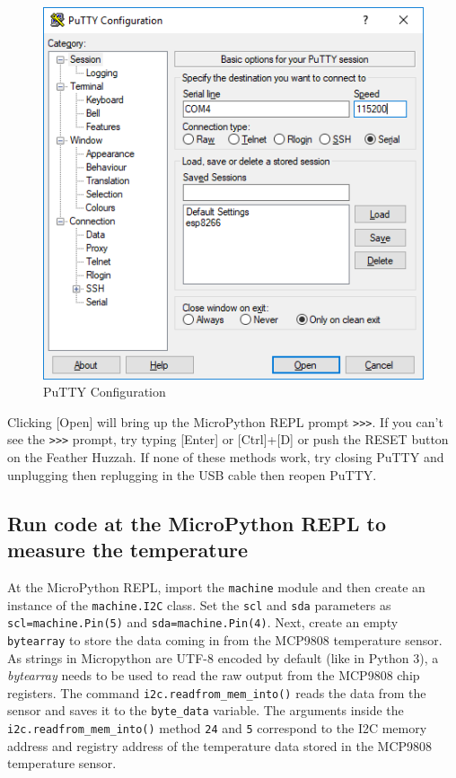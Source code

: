 \documentclass{book}
\makeatletter
\def\maxwidth{\ifdim\Gin@nat@width>\linewidth\linewidth
    \else\Gin@nat@width\fi}
\let\Oldincludegraphics\includegraphics
\renewcommand{\includegraphics}[1]{\Oldincludegraphics[width=.8\maxwidth]{#1}}
\makeatother
\begin{document}
\begin{figure}
\centering
\includegraphics{images/putty_config.PNG}
\caption{PuTTY Configuration}
\end{figure}

Clicking {[}Open{]} will bring up the MicroPython REPL prompt
\lstinline!>>>!. If you can't see the \lstinline!>>>! prompt, try typing
{[}Enter{]} or {[}Ctrl{]}+{[}D{]} or push the RESET button on the
Feather Huzzah. If none of these methods work, try closing PuTTY and
unplugging then replugging in the USB cable then reopen PuTTY.
    




    
        \subsection{Run code at the MicroPython REPL to measure the
temperature}\label{run-code-at-the-micropython-repl-to-measure-the-temperature}
    




    
        At the MicroPython REPL, import the \lstinline!machine! module and then
create an instance of the \lstinline!machine.I2C! class. Set the
\lstinline!scl! and \lstinline!sda! parameters as
\lstinline!scl=machine.Pin(5)! and \lstinline!sda=machine.Pin(4)!. Next,
create an empty \lstinline!bytearray! to store the data coming in from
the MCP9808 temperature sensor. As strings in Micropython are UTF-8
encoded by default (like in Python 3), a \emph{bytearray} needs to be
used to read the raw output from the MCP9808 chip registers. The command
\lstinline!i2c.readfrom_mem_into()! reads the data from the sensor and
saves it to the \lstinline!byte_data! variable. The arguments inside the
\lstinline!i2c.readfrom_mem_into()! method \lstinline!24! and
\lstinline!5! correspond to the I2C memory address and registry address
of the temperature data stored in the MCP9808 temperature sensor.
\end{document}
